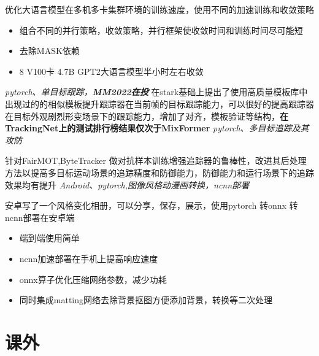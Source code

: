 \documentclass{uniquecv}
\begin{document}
优化大语言模型在多机多卡集群环境的训练速度，使用不同的加速训练和收敛策略
\begin{itemize}
  \item 组合不同的并行策略，收敛策略，并行框架使收敛时间和训练时间尽可能短
  \item 去除MASK依赖
  \item 8 V100卡 4.7B GPT2大语言模型半小时左右收敛
\end{itemize}
\textit{pytorch、单目标跟踪，\textbf{MM2022在投}}
\vspace{0.4ex}
在stark基础上提出了使用高质量模板库中出现过的的相似模板提升跟踪器在当前帧的目标跟踪能力，可以很好的提高跟踪器在目标外观剧烈形变场景下的跟踪能力，增加了对齐，模板验证等结构，\textbf{在TrackingNet上的测试排行榜结果仅次于MixFormer}
\textit{pytorch、多目标追踪及其攻防}
\vspace{0.4ex}

针对FairMOT,ByteTracker 做对抗样本训练增强追踪器的鲁棒性，改进其后处理方法以提高多目标运动场景的追踪精度和防御能力，防御能力和运行场景下的追踪效果均有提升
\textit{Android、pytorch,图像风格动漫画转换，ncnn部署}
\vspace{0.4ex}

安卓写了一个风格变化相册，可以分享，保存，展示，使用pytorch 转onnx 转 ncnn部署在安卓端
\begin{itemize}
  \item 端到端使用简单
  \item ncnn加速部署在手机上提高响应速度
  \item onnx算子优化压缩网络参数，减少功耗
  \item 同时集成matting网络去除背景抠图方便添加背景，转换等二次处理
\end{itemize}

\section{课外}
\end{document}
